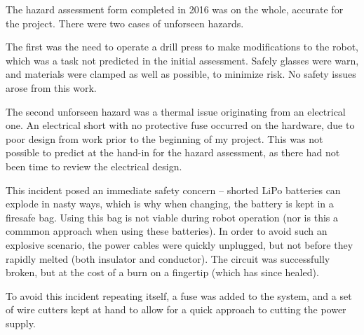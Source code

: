 \documentclass[main.tex]{subfiles}
\begin{document}
The hazard assessment form completed in 2016 was on the whole, accurate for the project.
There were two cases of unforseen hazards.

The first was the need to operate a drill press to make modifications to the robot, which was a task not predicted in the initial assessment.
Safely glasses were warn, and materials were clamped as well as possible, to minimize risk.
No safety issues arose from this work.

The second unforseen hazard was a thermal issue originating from an electrical one.
An electrical short with no protective fuse occurred on the hardware, due to poor design from work prior to the beginning of my project.
This was not possible to predict at the hand-in for the hazard assessment, as there had not been time to review the electrical design.

This incident posed an immediate safety concern -- shorted LiPo batteries can explode in nasty ways, which is why when changing, the battery is kept in a firesafe bag.
Using this bag is not viable during robot operation (nor is this a commmon approach when using these batteries).
In order to avoid such an explosive scenario, the power cables were quickly unplugged, but not before they rapidly melted (both insulator and conductor).
The circuit was successfully broken, but at the cost of a burn on a fingertip (which has since healed).

To avoid this incident repeating itself, a fuse was added to the system, and a set of wire cutters kept at hand to allow for a quick approach to cutting the power supply.
\end{document}
